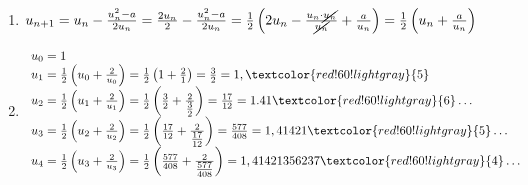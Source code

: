 \begin{enumerate}[label=R4.\arabic*, font=\bfseries, itemsep=8mm,labelsep*=4mm]
\begin{enumerate}[label=\roman*),itemsep=4mm]
\medskip
$x_1\in[-1;0]$  $\imply \eh{2} x_1\simeq -0.8837$%

\medskip
$x_2\in[1;2]$  $\imply \eh{2} x_2\simeq 1.6728$%

\medskip
$x_3\in[7;8]$  $\imply \eh{2} x_3\simeq 7.8613$%
\item La fonction $g(x)=\sin^2(x)+\frac{x}{3}$  a un zéro évident en $x_0=0$. Geogebra montre qu'elle possède 2 autres zéros;

\medskip
$x_1\in[-3;-2]$  $\imply \eh{2} x_1\simeq -2.1369$%

\medskip
$x_2\in[-1;0]$  $\imply \eh{2} x_2\simeq -0.3470$%
\end{enumerate}

\bigskip
\textit{A noter que pour être certain d'avoir la précision désirée, il faut fournir une décimale supplémentaire.}





\item $u_{n+1} = u_n - \frac{u_n^2-a}{2u_n}= \frac{2u_n}{2} - \frac{u_n^2-a}{2u_n} = \frac{1}{2}\left(2u_n - \frac{u_n\cdot \cancel{u_n}}{\cancel{u_n}}+\frac{a}{u_n} \right)=\frac{1}{2}\left(u_n + \frac{a}{u_n}\right)$







\item
\renewcommand{\arraystretch}{2.5}
\begin{minipage}[t][][b]{1\textwidth}\vspace{-8.5mm}
$\everymath{\textstyle}\begin{array}{l}
  u_0 = 1     \\
  u_1 = \frac12 \left(u_0+\frac{2}{u_0}\right) = \frac12\left(1+\frac{2}{1}\right) = \frac{3}{2} = 1,\textcolor{red!60!lightgray}{5} \\
  u_2 = \frac12 \left(u_1+\frac{2}{u_1}\right) = \frac12\left(\tfrac{3}{2}+\frac{2}{\tfrac{3}{2}}\right)
  = \frac{17}{12} = 1.41\textcolor{red!60!lightgray}{6}\ldots \\
  u_3 = \frac12 \left(u_2+\frac{2}{u_2}\right) = \frac12\left(\tfrac{17}{12}+\frac{2}{\tfrac{17}{12}}\right) = \frac{577}{408} = 1,41421\textcolor{red!60!lightgray}{5} \ldots \\
  u_4 = \frac12 \left(u_3+\frac{2}{u_3}\right) = \frac12\left(\tfrac{577}{408}+\frac{2}{\tfrac{577}{408}}\right) = 1,41421356237\textcolor{red!60!lightgray}{4}\ldots
\end{array}\everymath{\displaystyle}$
\end{minipage} 


\end{enumerate}
